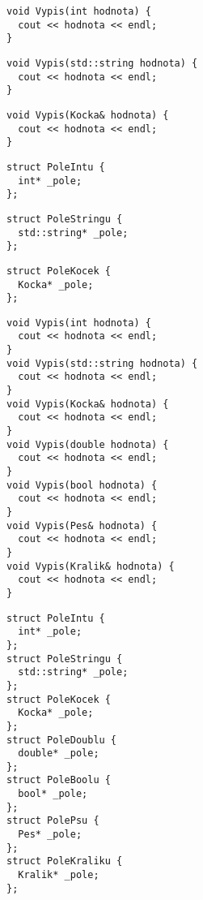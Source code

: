 
\begin{frame}[fragile]
\begin{twocols}
\begin{lstlisting}[basicstyle=\small]
void Vypis(int hodnota) {
  cout << hodnota << endl;
}
\end{lstlisting}
\vskip 1cm
\pause
\begin{lstlisting}[basicstyle=\small]
void Vypis(std::string hodnota) {
  cout << hodnota << endl;
}
\end{lstlisting}
\vskip 1cm
\pause
\begin{lstlisting}[basicstyle=\small]
void Vypis(Kocka& hodnota) {
  cout << hodnota << endl;
}
\end{lstlisting}

\twocolssep
\pause
\begin{lstlisting}[basicstyle=\small]
struct PoleIntu {
  int* _pole;
};
\end{lstlisting}
\vskip 1cm
\pause
\begin{lstlisting}[basicstyle=\small]
struct PoleStringu {
  std::string* _pole;
};
\end{lstlisting}
\vskip 1cm
\pause
\begin{lstlisting}[basicstyle=\small]
struct PoleKocek {
  Kocka* _pole;
};
\end{lstlisting}

\end{twocols}
\end{frame}






\begin{frame}[fragile]
\begin{twocols}
\begin{lstlisting}[basicstyle=\small]
void Vypis(int hodnota) {
  cout << hodnota << endl;
}
void Vypis(std::string hodnota) {
  cout << hodnota << endl;
}
void Vypis(Kocka& hodnota) {
  cout << hodnota << endl;
}
void Vypis(double hodnota) {
  cout << hodnota << endl;
}
void Vypis(bool hodnota) {
  cout << hodnota << endl;
}
void Vypis(Pes& hodnota) {
  cout << hodnota << endl;
}
void Vypis(Kralik& hodnota) {
  cout << hodnota << endl;
}
\end{lstlisting}

\twocolssep

\begin{lstlisting}[basicstyle=\small]
struct PoleIntu {
  int* _pole;
};
struct PoleStringu {
  std::string* _pole;
};
struct PoleKocek {
  Kocka* _pole;
};
struct PoleDoublu {
  double* _pole;
};
struct PoleBoolu {
  bool* _pole;
};
struct PolePsu {
  Pes* _pole;
};
struct PoleKraliku {
  Kralik* _pole;
};
\end{lstlisting}

\end{twocols}
\end{frame}












